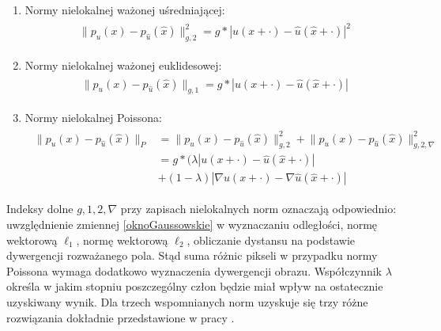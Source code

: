 \documentclass[12pt, twoside, openany]{report}
\theoremstyle{definition}
\begin{document}
\begin{enumerate}
\item
Normy nielokalnej ważonej uśredniającej:
\begin{align}
\begin{aligned}
\big\| p_{u}(x) - p_{\hat{u}}(\hat{x}) \big\|^{2}_{g,2} = g \ast | u(x+\cdot) - \hat{u}(\hat{x}+\cdot) |^2
\label{nonLocalMeans}
\end{aligned}
\end{align}
\item
Normy nielokalnej ważonej euklidesowej:
\begin{align}
\begin{aligned}
\big\| p_{u}(x) - p_{\hat{u}}(\hat{x}) \big\|_{g,1} = g \ast | u(x+\cdot) - \hat{u}(\hat{x}+\cdot) |
\label{nonLocalMedians}
\end{aligned}
\end{align}
\item
Normy nielokalnej Poissona:
\begin{align}
\begin{aligned}
\big\| p_{u}(x) - p_{\hat{u}}(\hat{x}) \big\|_{P} &= \big\| p_{u}(x) - p_{\hat{u}}(\hat{x}) \big\|^{2}_{g,2} + \big\| p_{u}(x) - p_{\hat{u}}(\hat{x}) \big\|^{2}_{g,2,\nabla} \\
&= g \ast (\lambda | u(x+\cdot) - \hat{u}(\hat{x}+\cdot) | \\
&+ (1-\lambda)|\nabla u(x+\cdot) - \nabla \hat{u}(\hat{x}+\cdot)|
\label{nonLocalpoisson}
\end{aligned}
\end{align}
\end{enumerate}
Indeksy dolne $g, 1, 2, \nabla$ przy zapisach nielokalnych norm oznaczają odpowiednio: uwzględnienie zmiennej \eqref{oknoGaussowskie} w wyznaczaniu odległości, normę wektorową $\ell_{1}$, normę wektorową $\ell_{2}$, obliczanie dystansu na podstawie dywergencji rozważanego pola. Stąd suma różnic pikseli w przypadku normy Poissona wymaga dodatkowo wyznaczenia dywergencji obrazu. Współczynnik $\lambda$ określa w jakim stopniu poszczególny człon będzie miał wpływ na ostatecznie uzyskiwany wynik. Dla trzech wspomnianych norm uzyskuje się trzy różne rozwiązania dokładnie przedstawione w pracy \cite{arias2011variational}.
\end{document}
